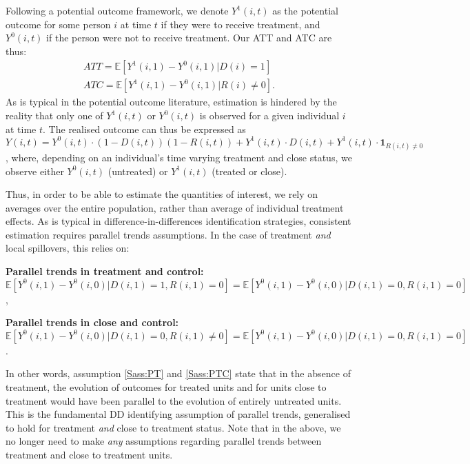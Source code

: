 Following a potential outcome framework, we denote $Y^1(i,t)$ as the potential
outcome for some person $i$ at time $t$ if they were to receive treatment, and
$Y^0(i,t)$ if the person were not to receive treatment.  Our ATT and ATC are
thus:
\begin{eqnarray}
\label{Seqn:estim}
ATT=\mathbb{E}[Y^1(i,1)-Y^0(i,1)|D(i)=1]\  \\
ATC=\mathbb{E}[Y^1(i,1)-Y^0(i,1)|R(i)\neq 0].
\end{eqnarray}
As is typical in the potential outcome literature, estimation is hindered by the
reality that only one of $Y^1(i,t)$ or $Y^0(i,t)$ is observed for a given 
individual $i$ at time $t$.  The realised outcome can thus be expressed as 
$Y(i,t)=Y^0(i,t)\cdot (1-D(i,t))(1-R(i,t))+Y^1(i,t)\cdot D(i,t)+Y^1(i,t)\cdot 
\mathbf{1}_{R(i,t)\neq 0}$, where, depending on an individual's time varying treatment and close
status, we observe either $Y^0(i,t)$ (untreated) or $Y^1(i,t)$ (treated or 
close).

Thus, in order to be able to estimate the quantities of interest, we rely on
averages over the entire population, rather than average of individual 
treatment effects.  As is typical in difference-in-differences identification
strategies,
consistent estimation requires parallel trends assumptions.  In the case of
treatment \emph{and} local spillovers, this relies on:

\begin{assumption}{1}{}
\label{Sass:PT}
\textbf{Parallel trends in treatment and control:} \\
$\mathbb{E}[Y^0(i,1)-Y^0(i,0)|D(i,1)=1,R(i,1)=0]=
\mathbb{E}[Y^0(i,1)-Y^0(i,0)|D(i,1)=0,R(i,1)=0]$,
\end{assumption}
\begin{assumption}{2}{}
\label{Sass:PTC}
\textbf{Parallel trends in close and control:} \\
$\mathbb{E}[Y^0(i,1)-Y^0(i,0)|D(i,1)=0,R(i,1)\neq 0]=
\mathbb{E}[Y^0(i,1)-Y^0(i,0)|D(i,1)=0,R(i,1)=0]$.
\end{assumption}

In other words, assumption \ref{Sass:PT}
and \ref{Sass:PTC} state that in the absence of treatment, the evolution
of outcomes for treated units and for units close to treatment would have
been parallel to the evolution of entirely untreated units.  This is the
fundamental DD identifying assumption of parallel trends, generalised to
hold for treatment \emph{and} close to treatment status.  Note that in
the above, we no longer need to make \emph{any} assumptions regarding
parallel trends between treatment and close to treatment units.

